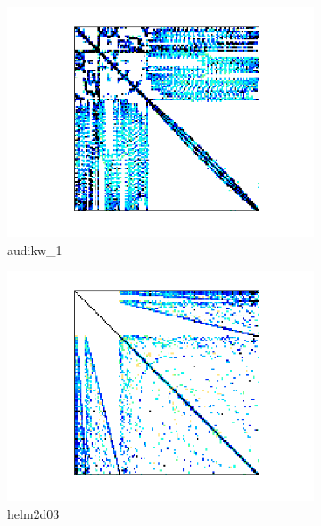 \begin{figure}[H]
    \centering
    \begin{subfigure}[b]{0.3\textwidth}
        \includegraphics[width=\textwidth]{./images/CG/audi.png}
        \caption{audikw\_1}
    \end{subfigure}
    \quad 
    \begin{subfigure}[b]{0.3\textwidth}
        \includegraphics[width=\textwidth]{./images/CG/helm2d03.png}
        \caption{helm2d03}
    \end{subfigure}
    \quad 
	\begin{subfigure}[b]{0.3\textwidth}

\end{subfigure}
\end{figure}
